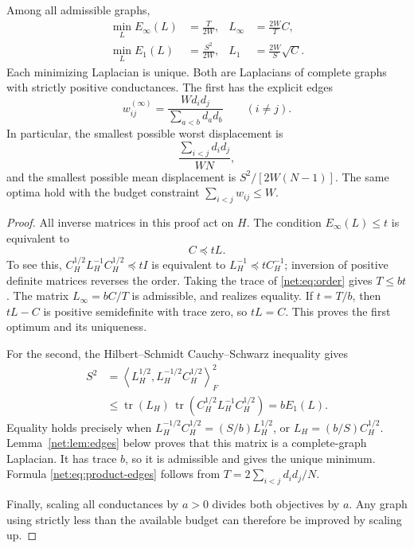 \begin{theorem}
\label{net:thm:optima}
Among all admissible graphs,
\begin{align}
 \min_L E_{\infty}(L)&=\frac{T}{2W},&
 L_{\infty}&=\frac{2W}{T}C, \label{net:eq:optimal-infty}\\
 \min_L E_1(L)&=\frac{S^2}{2W},&
 L_1&=\frac{2W}{S}\sqrt C. \label{net:eq:optimal-one}
\end{align}
Each minimizing Laplacian is unique. Both are Laplacians of complete graphs
with strictly positive conductances. The first has the explicit edges
\begin{equation}\label{net:eq:product-edges}
 w^{(\infty)}_{ij}
   =\frac{W d_i d_j}{\sum_{a<b}d_a d_b}\qquad(i\ne j).
\end{equation}
In particular, the smallest possible worst displacement is
\[
 \frac{\sum_{i<j}d_i d_j}{WN},
\]
and the smallest possible mean displacement is $S^2/[2W(N-1)]$.
The same optima hold with the budget constraint $\sum_{i<j}w_{ij}\le W$.
\end{theorem}

\begin{proof}
All inverse matrices in this proof act on $H$. The condition
$E_{\infty}(L)\le t$ is equivalent to
\begin{equation}\label{net:eq:order}
 C\preceq tL.
\end{equation}
To see this, $C_H^{1/2}L_H^{-1}C_H^{1/2}\preceq tI$ is equivalent to
$L_H^{-1}\preceq tC_H^{-1}$; inversion of positive definite matrices
reverses the order. Taking the trace of \eqref{net:eq:order} gives
$T\le bt$. The matrix $L_{\infty}=bC/T$ is admissible, and realizes
equality. If $t=T/b$, then $tL-C$ is positive semidefinite with trace zero,
so $tL=C$. This proves the first optimum and its uniqueness.

For the second, the Hilbert--Schmidt Cauchy--Schwarz inequality gives
\begin{align*}
 S^2
 &=\left\langle L_H^{1/2},L_H^{-1/2}C_H^{1/2}\right\rangle_F^2\\
 &\le \operatorname{tr}(L_H)\,
       \operatorname{tr}(C_H^{1/2}L_H^{-1}C_H^{1/2})
   =bE_1(L).
\end{align*}
Equality holds precisely when
$L_H^{-1/2}C_H^{1/2}=(S/b)L_H^{1/2}$, or
$L_H=(b/S)C_H^{1/2}$. Lemma~\ref{net:lem:edges} below proves that this
matrix is a complete-graph Laplacian. It has trace $b$, so it is
admissible and gives the unique minimum. Formula
\eqref{net:eq:product-edges} follows from
$T=2\sum_{i<j}d_i d_j/N$.

Finally, scaling all conductances by $a>0$ divides both objectives by $a$.
Any graph using strictly less than the available budget can therefore be
improved by scaling up.
\end{proof}

